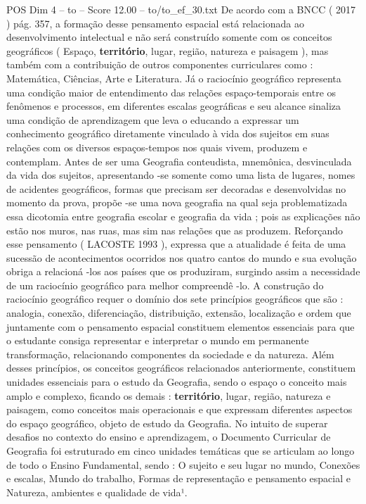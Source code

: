 \begin{textsample}{POS Dim 4 – to – Score 12.00 – to/to\_ef\_30.txt}
De acordo com a BNCC ( 2017 ) pág. 357, a formação desse pensamento espacial está relacionada ao desenvolvimento intelectual e não será construído somente com os conceitos geográficos ( Espaço, \textbf{território}, lugar, região, natureza e paisagem ), mas também com a contribuição de outros componentes curriculares como : Matemática, Ciências, Arte e Literatura.
Já o raciocínio geográfico representa uma condição maior de entendimento das relações espaço-temporais entre os fenômenos e processos, em diferentes escalas geográficas e seu alcance sinaliza uma condição de aprendizagem que leva o educando a expressar um conhecimento geográfico diretamente vinculado à vida dos sujeitos em suas relações com os diversos espaços-tempos nos quais vivem, produzem e contemplam.
Antes de ser uma Geografia conteudista, mnemônica, desvinculada da vida dos sujeitos, apresentando -se somente como uma lista de lugares, nomes de acidentes geográficos, formas que precisam ser decoradas e desenvolvidas no momento da prova, propõe -se uma nova geografia na qual seja problematizada essa dicotomia entre geografia escolar e geografia da vida ; pois as explicações não estão nos muros, nas ruas, mas sim nas relações que as produzem.
Reforçando esse pensamento ( LACOSTE 1993 ), expressa que a atualidade é feita de uma sucessão de acontecimentos ocorridos nos quatro cantos do mundo e sua evolução obriga a relacioná -los aos países que os produziram, surgindo assim a necessidade de um raciocínio geográfico para melhor compreendê -lo.
A construção do raciocínio geográfico requer o domínio dos sete princípios geográficos que são : analogia, conexão, diferenciação, distribuição, extensão, localização e ordem que juntamente com o pensamento espacial constituem elementos essenciais para que o estudante consiga representar e interpretar o mundo em permanente transformação, relacionando componentes da sociedade e da natureza.
Além desses princípios, os conceitos geográficos relacionados anteriormente, constituem unidades essenciais para o estudo da Geografia, sendo o espaço o conceito mais amplo e complexo, ficando os demais : \textbf{território}, lugar, região, natureza e paisagem, como conceitos mais operacionais e que expressam diferentes aspectos do espaço geográfico, objeto de estudo da Geografia.
No intuito de superar desafios no contexto do ensino e aprendizagem, o Documento Curricular de Geografia foi estruturado em cinco unidades temáticas que se articulam ao longo de todo o Ensino Fundamental, sendo : O sujeito e seu lugar no mundo, Conexões e escalas, Mundo do trabalho, Formas de representação e pensamento espacial e Natureza, ambientes e qualidade de vida¹.

\end{textsample}

